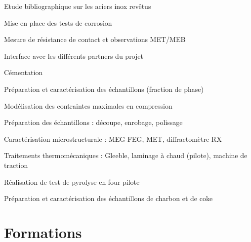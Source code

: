 \documentclass[11pt, a4paper, notitlepage]{article}
\begin{document}
	\begin{jobdetails}
		\item Etude bibliographique sur les aciers inox revêtus
		\item Mise en place des tests de corrosion
		\item Mesure de résistance de contact et observations MET/MEB
		\item Interface avec les différents partners du projet
	\end{jobdetails}

	\begin{jobdetails}
 		\item Cémentation
 		\item Préparation et caractérisation des échantillons (fraction de phase)
 		\item Modélisation des contraintes maximales en compression
	\end{jobdetails}

	\begin{jobdetails}
  		\item Préparation des échantillons : découpe, enrobage, polissage
  		\item Caractérisation microstructurale : MEG-FEG, MET, diffractomètre RX
  		\item Traitements thermomécaniques : Gleeble, laminage à chaud (pilote), machine de traction
	\end{jobdetails}

	\begin{jobdetails}
  		\item Réalisation de test de pyrolyse en four pilote
		\item Préparation et caractérisation des échantillons de charbon et de coke
	\end{jobdetails}
	
	\newpage
	
	\section*{Formations}
\end{document}
